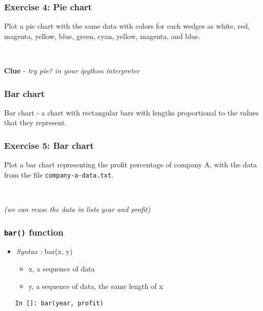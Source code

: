 \documentclass[presentation]{beamer}
\begin{document}
\begin{frame}[fragile]
\frametitle{Exercise 4: Pie chart}
\label{sec-10}

  Plot a pie chart with the same data with colors for each wedges as white, red, 
  magenta, yellow, blue, green, cyan, yellow, magenta, and blue.
\begin{verbatim}
   
\end{verbatim}

  \textbf{Clue} - \emph{try pie? in your ipython interpreter}
\end{frame}
\begin{frame}
\frametitle{Bar chart}
\label{sec-11}

  Bar chart - a chart with rectangular bars with lengths proportional 
  to the values that they represent.
\end{frame}
\begin{frame}[fragile]
\frametitle{Exercise 5: Bar chart}
\label{sec-12}

  Plot a bar chart representing the profit percentage of company A, with the data 
  from the file \verb~company-a-data.txt~.
\begin{verbatim}
   
\end{verbatim}

  \emph{(we can reuse the data in lists year and profit)}
\end{frame}
\begin{frame}[fragile]
\frametitle{\verb~bar()~ function}
\label{sec-13}


\begin{itemize}
\item \emph{Syntax :} bar(x, y)
\begin{itemize}
\item x, a sequence of data
\item y, a sequence of data, the same length of x
\end{itemize}
\end{itemize}
\begin{verbatim}
   In []: bar(year, profit)
\end{verbatim}
\end{frame}
\end{document}
